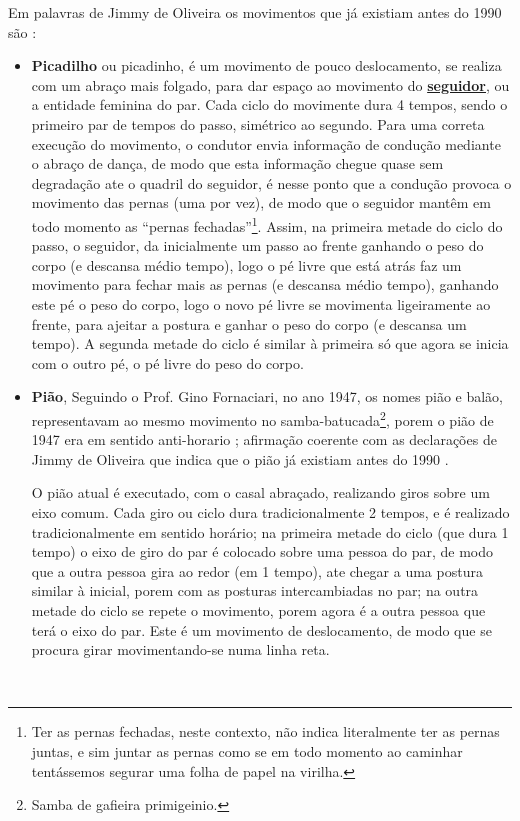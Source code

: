 Em palavras de Jimmy de Oliveira os movimentos que já existiam antes do 1990 são \cite{sambafunkeadoJimmyDeOliveiraPart1}:
\begin{itemize}
\item \textbf{Picadilho}
ou picadinho, é um movimento de pouco deslocamento, 
se realiza com um abraço mais folgado, 
para dar espaço ao movimento do \hyperref[def:Seguidor]{\textbf{seguidor}}, ou a entidade feminina do par.
Cada ciclo do movimente dura 4 tempos, sendo o primeiro par de tempos do passo, simétrico ao segundo.
Para uma correta execução do movimento, o condutor envia informação de condução mediante o abraço de dança,
de modo que esta informação chegue quase sem degradação ate o quadril do seguidor,
é nesse ponto que a condução provoca o movimento das pernas (uma por vez), de modo que
o seguidor mantêm em todo momento as ``pernas fechadas''\footnote{
Ter as pernas fechadas, neste contexto, não indica literalmente ter as pernas juntas, 
e sim juntar as pernas como se em todo momento ao caminhar tentássemos segurar uma folha de papel na virilha.}.
Assim, na primeira metade do ciclo do passo, o seguidor,
da inicialmente um passo ao frente ganhando o peso do corpo (e descansa médio tempo), 
logo o pé livre que está atrás faz um movimento para fechar mais as pernas (e descansa médio tempo), 
ganhando este pé o peso do corpo, logo o novo pé livre se movimenta ligeiramente ao frente, 
para ajeitar a postura e ganhar o peso do corpo (e descansa um tempo).
A segunda metade do ciclo é similar à primeira só que agora se inicia com o outro pé, 
o pé livre do peso do corpo.


\item \textbf{Pião}, 
Seguindo o Prof. Gino Fornaciari, no ano 1947, os nomes pião e balão,
representavam ao mesmo movimento no samba-batucada\footnote{Samba de gafieira primigeinio.}, 
porem o pião de 1947 era em sentido anti-horario \cite[pp. 68-72]{fornaciari1947aprender};
afirmação coerente com as declarações de Jimmy de Oliveira que indica que o pião já existiam antes do 1990 \cite{sambafunkeadoJimmyDeOliveiraPart1}.

O pião atual é executado, com o casal abraçado, realizando giros sobre um eixo comum.
Cada giro ou ciclo dura tradicionalmente 2 tempos, e é realizado tradicionalmente em sentido horário;
na primeira metade do ciclo (que dura 1 tempo) o eixo de giro do par é colocado sobre uma pessoa do par, 
de modo que a outra pessoa gira ao redor (em 1 tempo), ate chegar a uma postura similar à inicial, 
porem com as posturas intercambiadas no par;
na outra metade do ciclo se repete o movimento, porem agora é a outra pessoa que terá o eixo do par.
Este é um movimento de deslocamento, de modo que se procura girar movimentando-se numa linha reta.
\end{itemize}~\\

